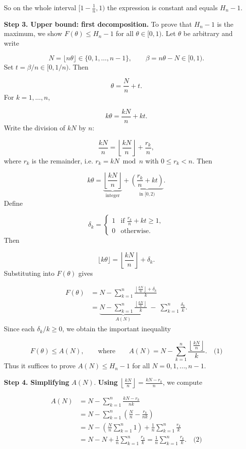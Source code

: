 \documentclass{llmxive}
\begin{document}
So on the whole interval \([1-\frac1n,1)\) the expression is constant and equals \(H_n-1\).\par
\textbf{Step 3. Upper bound: first decomposition.} To prove that \(H_n-1\) is the maximum, we show \(F(\theta)\le H_n-1\) for all \(\theta\in[0,1)\). Let \(\theta\) be arbitrary and write\par
\[
N = \lfloor n\theta\rfloor \in \{0,1,\dots,n-1\}, \qquad \beta = n\theta - N \in [0,1).
\]
Set \(t = \beta/n \in [0,1/n)\). Then\par
\[
\theta = \frac{N}{n} + t.
\]
For \(k=1,\dots,n\),\par
\[
k\theta = \frac{kN}{n} + kt.
\]
Write the division of \(kN\) by \(n\):\par
\[
\frac{kN}{n} = \left\lfloor\frac{kN}{n}\right\rfloor + \frac{r_k}{n},
\]
where \(r_k\) is the remainder, i.e. \(r_k = kN \bmod n\) with \(0\le r_k < n\). Then\par
\[
k\theta = \underbrace{\left\lfloor\frac{kN}{n}\right\rfloor}_{\text{integer}} + \underbrace{\left(\frac{r_k}{n} + kt\right)}_{\text{in }[0,2)}.
\]
Define\par
\[
\delta_k = \begin{cases}
1 & \text{if } \frac{r_k}{n} + kt \ge 1,\\
0 & \text{otherwise}.
\end{cases}
\]
Then\par
\[
\lfloor k\theta\rfloor = \left\lfloor\frac{kN}{n}\right\rfloor + \delta_k.
\]
Substituting into \(F(\theta)\) gives\par
\[
\begin{aligned}
F(\theta) &= N - \sum_{k=1}^{n}\frac{\left\lfloor\frac{kN}{n}\right\rfloor + \delta_k}{k} \\
&= \underbrace{N - \sum_{k=1}^{n}\frac{\left\lfloor\frac{kN}{n}\right\rfloor}{k}}_{A(N)} \;-\; \sum_{k=1}^{n}\frac{\delta_k}{k}.
\end{aligned}
\]
Since each \(\delta_k/k \ge 0\), we obtain the important inequality\par
\[
F(\theta) \le A(N),\qquad\text{where}\qquad A(N) = N - \sum_{k=1}^{n}\frac{\left\lfloor\frac{kN}{n}\right\rfloor}{k}. \quad\text{(1)}
\]
Thus it suffices to prove \(A(N) \le H_n - 1\) for all \(N = 0,1,\dots,n-1\).\par
\textbf{Step 4. Simplifying }\(A(N)\).\textbf{ Using }\(\left\lfloor\frac{kN}{n}\right\rfloor = \frac{kN - r_k}{n}\), we compute\par
\[
\begin{aligned}
A(N) &= N - \sum_{k=1}^{n}\frac{kN - r_k}{n k} \\
&= N - \sum_{k=1}^{n}\left(\frac{N}{n} - \frac{r_k}{n k}\right) \\
&= N - \left(\frac{N}{n}\sum_{k=1}^{n}1\right) + \frac1n\sum_{k=1}^{n}\frac{r_k}{k} \\
&= N - N + \frac1n\sum_{k=1}^{n}\frac{r_k}{k} = \frac1n\sum_{k=1}^{n}\frac{r_k}{k}. \quad\text{(2)}
\end{aligned}
\]
\end{document}
